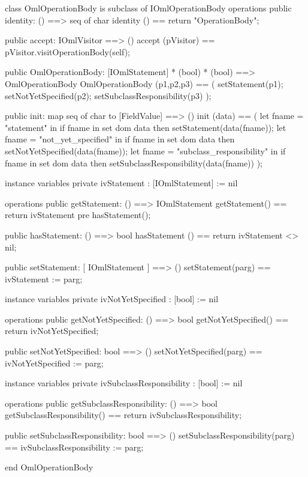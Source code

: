 \begin{vdm_al}
class OmlOperationBody is subclass of IOmlOperationBody
operations
  public identity: () ==> seq of char
  identity () == return "OperationBody";

  public accept: IOmlVisitor ==> ()
  accept (pVisitor) == pVisitor.visitOperationBody(self);

  public OmlOperationBody:
      [IOmlStatement] *
      (bool) *
      (bool) ==> OmlOperationBody
  OmlOperationBody (p1,p2,p3) == 
   ( setStatement(p1);
     setNotYetSpecified(p2);
     setSubclassResponsibility(p3) );

  public init: map seq of char to [FieldValue] ==> ()
  init (data) ==
    ( let fname = "statement" in
        if fname in set dom data
        then setStatement(data(fname));
      let fname = "not_yet_specified" in
        if fname in set dom data
        then setNotYetSpecified(data(fname));
      let fname = "subclass_responsibility" in
        if fname in set dom data
        then setSubclassResponsibility(data(fname)) );

instance variables
  private ivStatement : [IOmlStatement] := nil

operations
  public getStatement: () ==> IOmlStatement
  getStatement() == return ivStatement
    pre hasStatement();

  public hasStatement: () ==> bool
  hasStatement () == return ivStatement <> nil;

  public setStatement: [ IOmlStatement ] ==> ()
  setStatement(parg) == ivStatement := parg;

instance variables
  private ivNotYetSpecified : [bool] := nil

operations
  public getNotYetSpecified: () ==> bool
  getNotYetSpecified() == return ivNotYetSpecified;

  public setNotYetSpecified: bool ==> ()
  setNotYetSpecified(parg) == ivNotYetSpecified := parg;

instance variables
  private ivSubclassResponsibility : [bool] := nil

operations
  public getSubclassResponsibility: () ==> bool
  getSubclassResponsibility() == return ivSubclassResponsibility;

  public setSubclassResponsibility: bool ==> ()
  setSubclassResponsibility(parg) == ivSubclassResponsibility := parg;

end OmlOperationBody
\end{vdm_al}

